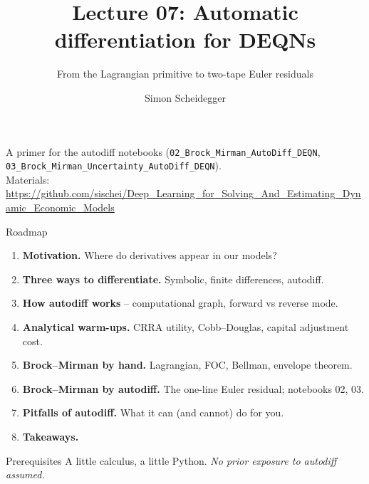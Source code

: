 \documentclass[aspectratio=169,11pt]{beamer}
\title[Lecture 07]{Lecture 07: Automatic differentiation for DEQNs}
\subtitle{From the Lagrangian primitive to two-tape Euler residuals}
\author{Simon Scheidegger}
\institute[HEC Lausanne]{HEC, University of Lausanne}
\date{}
\begin{document}

{
\begin{frame}
\titlepage
\vspace{-0.4cm}
\begin{center}
{\footnotesize A primer for the autodiff notebooks (\texttt{02\_Brock\_Mirman\_AutoDiff\_DEQN}, \texttt{03\_Brock\_Mirman\_Uncertainty\_AutoDiff\_DEQN}).}\\[4pt]
{\footnotesize Materials: \url{https://github.com/sischei/Deep_Learning_for_Solving_And_Estimating_Dynamic_Economic_Models}}
\end{center}
\end{frame}
}

\begin{frame}{Roadmap}
\begin{enumerate}\itemsep4pt
  \item \textbf{Motivation.} Where do derivatives appear in our models?
  \item \textbf{Three ways to differentiate.} Symbolic, finite differences, autodiff.
  \item \textbf{How autodiff works} -- computational graph, forward vs reverse mode.
  \item \textbf{Analytical warm-ups.} CRRA utility, Cobb--Douglas, capital adjustment cost.
  \item \textbf{Brock--Mirman by hand.} Lagrangian, FOC, Bellman, envelope theorem.
  \item \textbf{Brock--Mirman by autodiff.} The one-line Euler residual; notebooks 02, 03.
  \item \textbf{Pitfalls of autodiff.} What it can (and cannot) do for you.
  \item \textbf{Takeaways.}
\end{enumerate}
\vspace{6pt}
\begin{block}{Prerequisites}
\small
A little calculus, a little Python. \emph{No prior exposure to autodiff assumed.}
\end{block}
\end{frame}
\end{document}
